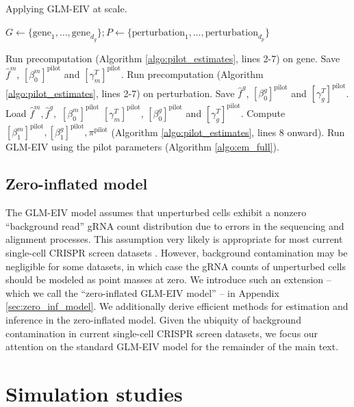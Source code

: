 \documentclass[12pt]{article}
\begin{document}
\begin{algorithm}
	\caption{Applying GLM-EIV at scale.}\label{algo:at_scale}
	\begin{algorithmic}
		\State $G \gets \{\textrm{gene}_1, \dots, \textrm{gene}_{d_g}\}; P \gets \{\textrm{perturbation}_1, \dots, \textrm{perturbation}_{d_p}\}$
		
			\State Run precomputation (Algorithm \ref{algo:pilot_estimates}, lines 2-7) on gene. \State Save $\hat{f}^m$, $[\beta^m_0]^\textrm{pilot}$ and $[\gamma^T_m]^\textrm{pilot}$.
		\EndFor
		\State Run precomputation  (Algorithm \ref{algo:pilot_estimates}, lines 2-7) on perturbation.
		\State Save $\hat{f}^g$, $[\beta^g_0]^\textrm{pilot}$ and $[\gamma^T_g]^\textrm{pilot}$.
		\EndFor
		\State Load $\hat{f}^m, \hat{f}^g,$ $[\beta^m_0]^\textrm{pilot}$ $[\gamma^T_m]^\textrm{pilot}$, $[\beta^g_0]^\textrm{pilot}$ and $[\gamma^T_g]^\textrm{pilot}$.
		\State Compute $[\beta^m_1]^\textrm{pilot}, [\beta^g_1]^\textrm{pilot}, \pi^\textrm{pilot}$ (Algorithm \ref{algo:pilot_estimates}, lines 8 onward).
		\State Run GLM-EIV using the pilot parameters (Algorithm \ref{algo:em_full}).
		\EndFor
	\end{algorithmic}
\end{algorithm}

\subsection{Zero-inflated model}
The GLM-EIV model assumes that unperturbed cells exhibit a nonzero ``background read'' gRNA count distribution due to errors in the sequencing and alignment processes. This assumption very likely is appropriate for most current single-cell CRISPR screen datasets \cite{Replogle2020}. However, background contamination may be negligible for some datasets, in which case the gRNA counts of unperturbed cells should be modeled as point masses at zero. We introduce such an extension -- which we call the ``zero-inflated GLM-EIV model'' -- in Appendix \ref{sec:zero_inf_model}. We additionally derive efficient methods for estimation and inference in the zero-inflated model. Given the ubiquity of background contamination in current single-cell CRISPR screen datasets, we focus our attention on the standard GLM-EIV model for the remainder of the main text.

\section{Simulation studies}\label{sec:simulation}
\end{document}
